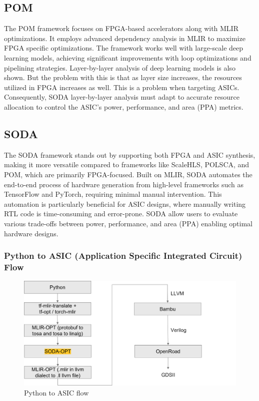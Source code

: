 \subsection{POM}

The POM \cite{zhang2024optimizingframeworkmlirefficient} framework focuses on FPGA-based accelerators along with MLIR optimizations. It employs advanced dependency analysis in MLIR to maximize FPGA specific optimizations. The framework works well with large-scale deep learning models, achieving significant improvements with loop optimizations and pipelining strategies. Layer-by-layer analysis of deep learning models is also shown. But the problem with this is that as layer size increases, the resources utilized in FPGA increases as well. This is a problem when targeting ASICs. Consequently, SODA layer-by-layer analysis must adapt to accurate resource allocation to control the ASIC's power, performance, and area (PPA) metrics.

\subsection{SODA}

The SODA framework stands out by supporting both FPGA and ASIC synthesis, making it more versatile compared to frameworks like ScaleHLS, POLSCA, and POM, which are primarily FPGA-focused. Built on MLIR, SODA automates the end-to-end process of hardware generation from high-level frameworks such as TensorFlow and PyTorch, requiring minimal manual intervention. This automation is particularly beneficial for ASIC designs, where manually writing RTL code is time-consuming and error-prone. SODA allow users to evaluate various trade-offs between power, performance, and area (PPA) enabling optimal hardware designs.

\subsubsection{Python to ASIC (Application Specific Integrated Circuit) Flow}

\begin{figure}[H]
    \centering
    \includegraphics[width=0.8\linewidth]{figure//chapter1_intro/Fig 1 - Python to ASIC flow.png}
    \caption{Python to ASIC flow}
    \label{fig:1.1}
\end{figure}

